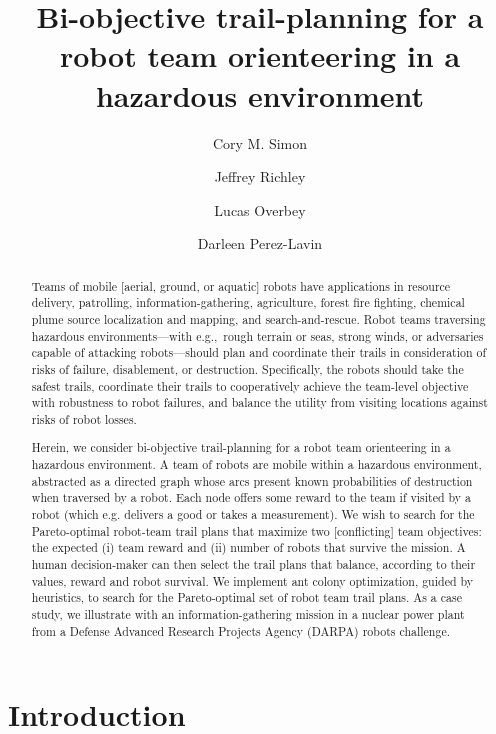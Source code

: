 \documentclass[11pt, oneside]{article}
\title{
Bi-objective trail-planning for a robot team orienteering in a hazardous environment
}
\author[1]{Cory M. Simon}
\author[2]{Jeffrey Richley}
\author[2]{Lucas Overbey}
\author[2]{Darleen Perez-Lavin}
\affil[1]{School of Chemical, Biological, and Environmental Engineering. Oregon State University. Corvallis, OR. USA.}
\affil[2]{Naval Information Warfare Center Atlantic. Charleston, SC. USA.}
\begin{document}
\maketitle

\begin{abstract}
Teams of mobile [aerial, ground, or aquatic] robots have applications in resource delivery, patrolling, information-gathering, agriculture, forest fire fighting, chemical plume source localization and mapping, and search-and-rescue.
Robot teams traversing hazardous environments---with e.g.,\ rough terrain or seas, strong winds, or adversaries capable of attacking robots---should plan and coordinate their trails in consideration of risks of failure, disablement, or destruction.
Specifically, the robots should take the safest trails, coordinate their trails to cooperatively achieve the team-level objective with robustness to robot failures, and balance the utility from visiting locations against risks of robot losses.

Herein, we consider bi-objective trail-planning for a robot team orienteering in a hazardous environment.
A team of robots are mobile within a hazardous environment, abstracted as a directed graph whose arcs present known probabilities of destruction when traversed by a robot.
Each node offers some reward to the team if visited by a robot (which e.g. delivers a good or takes a measurement).
We wish to search for the Pareto-optimal robot-team trail plans that maximize two [conflicting] team objectives: the expected (i) team reward and (ii) number of robots that survive the mission. 
A human decision-maker can then select the trail plans that balance, according to their values, reward and robot survival.
We implement ant colony optimization, guided by heuristics, to search for the Pareto-optimal set of robot team trail plans. 
As a case study, we illustrate with an information-gathering mission in a nuclear power plant from a Defense Advanced Research Projects Agency (DARPA) robots challenge.

\end{abstract}

\clearpage


\section{Introduction}
\end{document}
